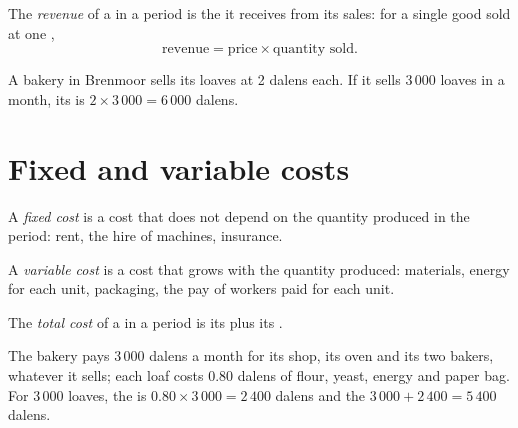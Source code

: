 \begin{definition}[Revenue]\label{def:g7:firms:revenue}
The \emph{revenue} of a  in a period is the  it receives from its
sales: for a single good sold at one ,
\[
\text{revenue} = \text{price} \times \text{quantity sold}.
\]
\end{definition}

\begin{example}
A bakery in Brenmoor sells its loaves at 2 dalens each. If it sells $3\,000$ loaves in a month,
its  is $2 \times 3\,000 = 6\,000$ dalens.
\end{example}

\section{Fixed and variable costs}

\begin{definition}\label{def:g7:firms:fixed-cost}
A \emph{fixed cost} is a cost that does not depend on the quantity produced
in the period: rent, the hire of machines, insurance.
\end{definition}

\begin{definition}\label{def:g7:firms:variable-cost}
A \emph{variable cost} is a cost that grows with the quantity produced:
materials, energy for each unit, packaging, the pay of workers paid for each unit.
\end{definition}

\begin{definition}\label{def:g7:firms:total-cost}
The \emph{total cost} of a  in a period is its  plus its
.
\end{definition}

\begin{example}
The bakery pays $3\,000$ dalens a month for its shop, its oven and its two bakers, whatever it
sells; each loaf costs $0.80$ dalens of flour, yeast, energy and paper bag. For $3\,000$ loaves,
the  is $0.80 \times 3\,000 = 2\,400$ dalens and the  $3\,000 + 2\,400 =
5\,400$ dalens.
\end{example}

